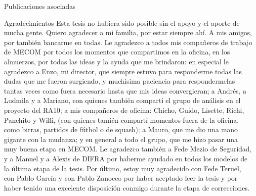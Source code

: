 \documentclass[12pt,screen,twoside,pagebackref]{ibtesis}
\begin{document}
\begin{postliminary}
\begin{seccion}{Publicaciones asociadas}
\begin{itemize}
\end{itemize}
\end{seccion}

\begin{seccion}{Agradecimientos}
Esta tesis no hubiera sido posible sin el apoyo y el aporte de mucha gente.
Quiero agradecer a mi familia, por estar siempre ahí.
A mis amigos, por también bancarme en todas.
Le agradezco a todos mis compañeros de trabajo de MECOM por todos los momentos que compartimos en la oficina, en los almuerzos, por todas las ideas y la ayuda que me brindaron:
en especial le agradezco a Enzo, mi director, que siempre estuvo para responderme todas las dudas que me fueron surgiendo, y muchísima paciencia para respondermelas tantas veces como fuera necesario hasta que mis ideas convergieran; a Andrés, a Ludmila y a Mariano, con quienes también compartí el grupo de análisis en el proyecto del RA10; a mis compañeros de oficina: Chicho, Guido, Lisette, Richi, Panchito y Willi, (con quienes tamién compartí momentos fuera de la oficina, como birras, partidos de fútbol o de squash); a Mauro, que me dio una mano gigante con la mudanza; y en general a todo el grupo, que me hizo pasar una muy buena etapa en MECOM.
Le agradezco también a Fede Mezio de Seguridad, y a Manuel y a Alexis de DIFRA por haberme ayudado en todos los modelos de la última etapa de la tesis.
Por último, estoy muy agradecido con Fede Teruel, con Pablo García y con Pablo Zanocco por haber aceptado leer la tesis y por haber tenido una excelente disposición conmigo durante la etapa de correcciones.
\end{seccion}

\end{postliminary}
\end{document}
